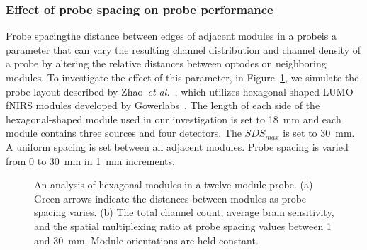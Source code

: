 \subsubsection{Effect of probe spacing on probe performance}
Probe spacing\textemdash the distance between edges of adjacent modules in a probe\textemdash is a parameter that can vary the resulting channel distribution and channel density of a probe by altering the relative distances between optodes on neighboring modules. To investigate the effect of this parameter, in Figure~\ref{fig:spacing}, we simulate the probe layout described by Zhao~\emph{et al.}~\cite{Zhao2019}, which utilizes hexagonal-shaped LUMO \ac{fNIRS} modules developed by Gowerlabs~\cite{Gowerlabs2019}. The length of each side of the hexagonal-shaped module used in our investigation is set to 18~mm and each module contains three sources and four detectors. The $SDS_{max}$ is set to 30~mm. A uniform spacing is set between all adjacent modules. Probe spacing is varied from 0 to 30~mm in 1~mm increments. 


\begin{figure}
    \begin{center}
    \end{center}
    \caption {An analysis of hexagonal modules in a twelve-module probe. (a) Green arrows indicate the distances between modules as probe spacing varies. (b) The total channel count, average brain sensitivity, and the spatial multiplexing ratio at probe spacing values between 1 and 30~mm. Module orientations are held constant.} 
    \label{fig:spacing}
\end{figure} 

